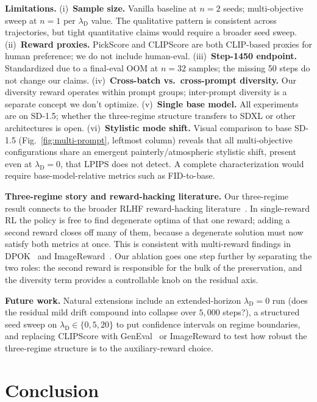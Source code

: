 \documentclass[10pt,letterpaper]{article}
\newcommand{\paragraphhead}[1]{\vspace{0.4ex}\noindent\textbf{#1}\hspace{0.5em}}
\newcommand{\lambdaD}{\lambda_{\mathrm{D}}}
\begin{document}
\paragraphhead{Limitations.}
(i)~\textbf{Sample size.} Vanilla baseline at $n{=}2$ seeds; multi-objective sweep at $n{=}1$ per $\lambdaD$ value. The qualitative pattern is consistent across trajectories, but tight quantitative claims would require a broader seed sweep. (ii)~\textbf{Reward proxies.} PickScore and CLIPScore are both CLIP-based proxies for human preference; we do not include human-eval. (iii)~\textbf{Step-1450 endpoint.} Standardized due to a final-eval OOM at $n{=}32$ samples; the missing 50 steps do not change our claims. (iv)~\textbf{Cross-batch vs.\ cross-prompt diversity.} Our diversity reward operates within prompt groups; inter-prompt diversity is a separate concept we don't optimize. (v)~\textbf{Single base model.} All experiments are on SD-1.5; whether the three-regime structure transfers to SDXL or other architectures is open. (vi)~\textbf{Stylistic mode shift.} Visual comparison to base SD-1.5 (Fig.~\ref{fig:multi-prompt}, leftmost column) reveals that all multi-objective configurations share an emergent painterly/atmospheric stylistic shift, present even at $\lambdaD{=}0$, that LPIPS does not detect. A complete characterization would require base-model-relative metrics such as FID-to-base.

\paragraphhead{Three-regime story and reward-hacking literature.}
Our three-regime result connects to the broader RLHF reward-hacking literature~\citep{Skalse22}. In single-reward RL the policy is free to find degenerate optima of that one reward; adding a second reward closes off many of them, because a degenerate solution must now satisfy both metrics at once. This is consistent with multi-reward findings in DPOK~\citep{Fan23} and ImageReward~\citep{Xu23}. Our ablation goes one step further by separating the two roles: the second reward is responsible for the bulk of the preservation, and the diversity term provides a controllable knob on the residual axis.

\paragraphhead{Future work.}
Natural extensions include an extended-horizon $\lambdaD{=}0$ run (does the residual mild drift compound into collapse over $5{,}000$ steps?), a structured seed sweep on $\lambdaD \in \{0, 5, 20\}$ to put confidence intervals on regime boundaries, and replacing CLIPScore with GenEval~\citep{Ghosh23} or ImageReward to test how robust the three-regime structure is to the auxiliary-reward choice.

\FloatBarrier
\section{Conclusion}
\label{sec:conclusion}
\end{document}
